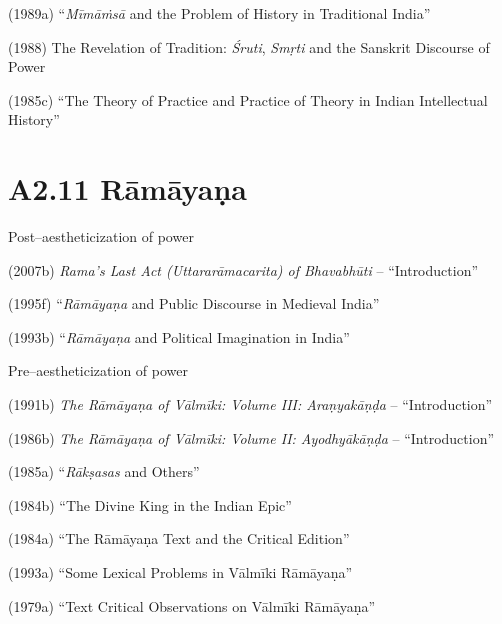  \item (1989a) “\textit{Mīmāṁsā} and the Problem of History in Traditional India”

 \item (1988) The Revelation of Tradition: \textit{Śruti}, \textit{Smṛti} and the Sanskrit Discourse of Power 

 \item (1985c) “The Theory of Practice and Practice of Theory in Indian Intellectual History”



\section*{A2.11 Rāmāyaṇa}

Post–aestheticization of power

\item (2007b) \textit{Rama's Last Act (Uttararāmacarita) of Bhavabhūti} – “Introduction”

 \item (1995f) “\textit{Rāmāyaṇa} and Public Discourse in Medieval India”

 \item (1993b) “\textit{Rāmāyaṇa} and Political Imagination in India”

Pre–aestheticization of power

\item (1991b) \textit{The Rāmāyaṇa of Vālmīki: Volume III: Araṇyakāṇḍa} – “Introduction”

 \item (1986b) \textit{The Rāmāyaṇa of Vālmīki: Volume II: Ayodhyākāṇḍa} – “Introduction”

 \item (1985a) “\textit{Rākṣasas} and Others”

 \item (1984b) “The Divine King in the Indian Epic”

 \item (1984a) “The Rāmāyaṇa Text and the Critical Edition”

 \item (1993a) “Some Lexical Problems in Vālmīki Rāmāyaṇa”

 \item (1979a) “Text Critical Observations on Vālmīki Rāmāyaṇa”



